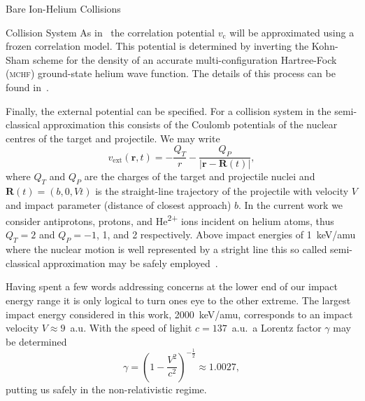 \documentclass[letterpaper, 11 pt]{report}
\begin{document}
\begin{chapter}{Bare Ion-Helium Collisions \label{chap:p-he2p-he}}
\begin{section}{Collision System \label{sec:p-he2p-he-sys}}
      As in~\cite{pbarhe} the correlation potential $v_\mathrm{c}$ will be approximated using a frozen
      correlation model. This potential is determined by inverting the Kohn-Sham scheme for the density
      of an accurate multi-configuration Hartree-Fock~\cite{mchf} (\textsc{mchf}) ground-state helium
      wave function. The details of this process can be found in~\cite{thesis, pbarhe}.

      Finally, the external potential can be specified. For a collision system in the semi-classical
      approximation this consists of the Coulomb potentials of the nuclear centres of the target and
      projectile. We may write
      \begin{equation} \label{eq:phe2p-ext}
         v_\mathrm{ext}(\mathbf{r},t) = -\frac{Q_T}{r}
         - \frac{Q_P}{\left| \mathbf{r} - \mathbf{R}(t) \right|},
      \end{equation}
      where $Q_T$ and $Q_P$ are the charges of the target and projectile nuclei and
      $\mathbf{R}(t) = (b,0,V t)$ is the straight-line trajectory of the projectile with velocity $V$ and
      impact parameter (distance of closest approach) $b$. In the current work we consider antiprotons,
      protons, and He\textsuperscript{2+} ions incident on helium atoms, thus $Q_T = 2$ and
      $Q_P = -1$, 1, and 2 respectively. Above impact energies of 1~keV/amu where the nuclear motion is
      well represented by a stright line this so called semi-classical approximation may be safely
      employed~\cite{bgm-rev}.

      Having spent a few words addressing concerns at the lower end of our impact energy range it is
      only logical to turn ones eye to the other extreme. The largest impact energy considered in this
      work, 2000~keV/amu, corresponds to an impact velocity $V \approx 9$~a.u. With the speed of lighit
      $c = 137$~a.u.\ a Lorentz factor $\gamma$ may be determined
      \begin{equation} \label{eq:lorentz}
         \gamma = \left( 1 - \frac{V^2}{c^2} \right)^{-\frac{1}{2}} \approx 1.0027,
      \end{equation}
      putting us safely in the non-relativistic regime.


\end{section}
\end{chapter}
\end{document}
